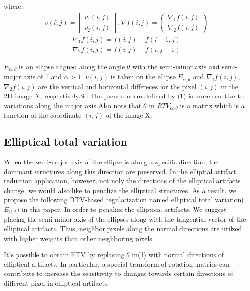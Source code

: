 \documentclass[hyperref]{ctexart}
\begin{document}
{\begin{multicols}{2}
		where:
		\begin{equation}
			\begin{split}
				v(i,j) = \begin{bmatrix} v_1(i,j) \\  v_2(i,j)  \end{bmatrix},\nabla f (i,j) = \begin{pmatrix} \nabla_1 f(i,j) \\ \nabla_2 f(i,j)  \end{pmatrix}
			\end{split}
		\end{equation}
		\begin{equation}
			\begin{split}
				\nabla_1 f(i,j) =  f(i,j)-f(i-1,j) \\ \nabla_2 f(i,j) = f(i,j)-f(i,j-1) 
			\end{split}
		\end{equation}
	
		$E_{\alpha,\theta}$  is an ellipse aligned along the angle $\theta$ with the semi-minor axis and semi-major axis of 1 and $\alpha > 1$. $v(i,j)$ is taken on the ellipse  $E_{\alpha,\theta}$ and $\nabla_1f(i,j)$, $\nabla_2f(i,j) $ are the vertical and horizontal differeces for the pixel $(i,j)$ in the 2D image $X$, respectively.So The pseudo norm defined by (1) is more senstive to variations along the major axis.Also note that $\theta$ in $RTV_{\alpha,\theta}$ is a matrix which is a function of the coordinate $(i,j)$ of the image X.
		\subsection{Elliptical total variation}
		When the semi-major axis of the ellipse is along a specific direction, the dominant structures along this direction are preserved. In the elliptial artifact reduction application, however, not noly the directions of the elliptical artifacts change, we would also like to penalize the elliptical structures. As a result, we propose the following DTV-based regularization named elliptical total variation( $E_{\beta,\lambda}$) in this paper. In order to penalize the elliptical artifacts. We suggest placing the semi-minor axis of the ellipses along with the tangential vector of the elliptical artifacts. Thus,  neighbor pixels along the normal directions are utilzed with higher weights than other neighboring pixels.
		
		It's possible to obtain ETV by replacing $\theta$ in(1) with normal directions of elliptical artifacts. In particular, a special transform of rotation matries can contribute to increase the sensitivity to changes towards certain directions of different pixel in elliptical artifacts.
		

\end{multicols}}
\end{document}
